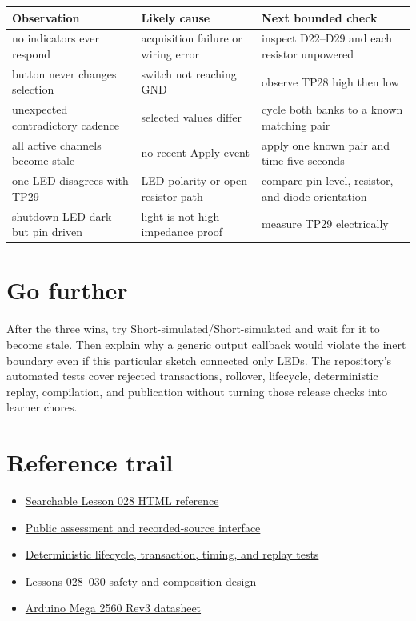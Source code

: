 \documentclass[11pt]{article}
\begin{document}
\begin{tabularx}{\linewidth}{@{}l X X@{}}
\toprule
Observation & Likely cause & Next bounded check\\
\midrule
no indicators ever respond & acquisition failure or wiring error & inspect D22--D29 and each resistor unpowered\\
button never changes selection & switch not reaching GND & observe TP28 high then low\\
unexpected contradictory cadence & selected values differ & cycle both banks to a known matching pair\\
all active channels become stale & no recent Apply event & apply one known pair and time five seconds\\
one LED disagrees with TP29 & LED polarity or open resistor path & compare pin level, resistor, and diode orientation\\
shutdown LED dark but pin driven & light is not high-impedance proof & measure TP29 electrically\\
\bottomrule
\end{tabularx}

\section{Go further}

After the three wins, try Short-simulated/Short-simulated and wait for it to
become stale. Then explain why a generic output callback would violate the
inert boundary even if this particular sketch connected only LEDs. The
repository's automated tests cover rejected transactions, rollover, lifecycle,
deterministic replay, compilation, and publication without turning those
release checks into learner chores.

\section{Reference trail}

\begin{itemize}
  \item \href{https://spincyc.github.io/adk/lessons/028/}
        {Searchable Lesson 028 HTML reference}
  \item \href{https://github.com/spincyc/adk/blob/main/src/inert_channel_assessor.h}
        {Public assessment and recorded-source interface}
  \item \href{https://github.com/spincyc/adk/blob/main/tests/test_inert_channel_assessor.cpp}
        {Deterministic lifecycle, transaction, timing, and replay tests}
  \item \href{https://github.com/spincyc/adk/blob/main/docs/design/LESSONS_028_030.md}
        {Lessons 028--030 safety and composition design}
  \item \href{https://docs.arduino.cc/resources/datasheets/A000067-datasheet.pdf}
        {Arduino Mega 2560 Rev3 datasheet}
\end{itemize}
\end{document}
